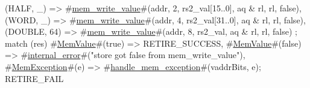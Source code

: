 {{{{{{            (HALF, _)     => #\hyperref[sailRISCVzmemzywritezyvalue]{mem\_write\_value}#(addr, 2, rs2_val[15..0], aq & rl, rl, false),
            (WORD, _)     => #\hyperref[sailRISCVzmemzywritezyvalue]{mem\_write\_value}#(addr, 4, rs2_val[31..0], aq & rl, rl, false),
            (DOUBLE, 64) => #\hyperref[sailRISCVzmemzywritezyvalue]{mem\_write\_value}#(addr, 8, rs2_val,        aq & rl, rl, false)
          };
          match (res) {
            #\hyperref[sailRISCVzMemValue]{MemValue}#(true)  => RETIRE_SUCCESS,
            #\hyperref[sailRISCVzMemValue]{MemValue}#(false) => #\hyperref[sailRISCVzinternalzyerror]{internal\_error}#("store got false from mem_write_value"),
            #\hyperref[sailRISCVzMemException]{MemException}#(e) => { #\hyperref[sailRISCVzhandlezymemzyexception]{handle\_mem\_exception}#(vaddrBits, e); RETIRE_FAIL }
          }
        }
      }
    }
  }
}

